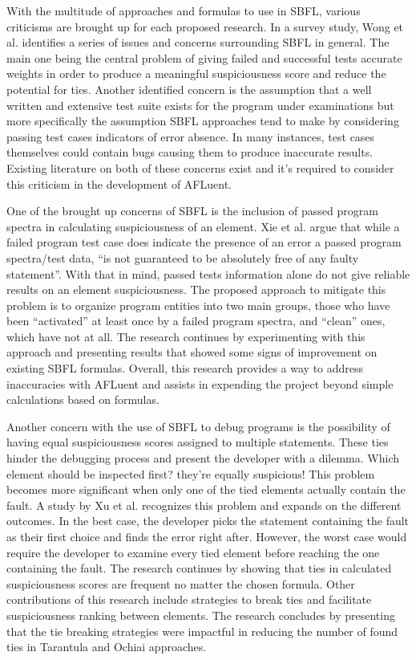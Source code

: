 With the multitude of approaches and formulas to use in SBFL, various criticisms
are brought up for each proposed research. In a survey study, Wong et al.
\cite{wong2016survey} identifies a series of issues and concerns surrounding
SBFL in general. The main one being the central problem of giving failed and
successful tests accurate weights in order to produce a meaningful
suspiciousness score and reduce the potential for ties. Another identified
concern is the assumption that a well written and extensive test suite exists
for the program under examinations but more specifically the assumption SBFL approaches tend to make by
considering passing test cases indicators of error absence. In many instances,
test cases themselves could contain bugs causing them to produce inaccurate results. Existing literature
on both of these concerns exist and it's required to consider this criticism in
the development of AFLuent.

One of the brought up concerns of SBFL is the inclusion of passed program
spectra in calculating suspiciousness of an element. Xie et al.
\cite{xie2010isolating} argue that while a failed program test case does
indicate the presence of an error a passed program spectra/test data, ``is not
guaranteed to be absolutely free of any faulty statement''. With that in mind,
passed tests information alone do not give reliable results on an element
suspiciousness. The proposed approach to mitigate this problem is to organize
program entities into two main groups, those who have been ``activated'' at
least once by a failed program spectra, and ``clean'' ones, which have not at
all. The research continues by experimenting with this approach and presenting
results that showed some signs of improvement on existing SBFL formulas.
Overall, this research provides a way to address inaccuracies with AFLuent and
assists in expending the project beyond simple calculations based on formulas.

Another concern with the use of SBFL to debug programs is the possibility of
having equal suspiciousness scores assigned to multiple statements. These ties
hinder the debugging process and present the developer with a dilemma. Which
element should be inspected first? they're equally suspicious! This problem
becomes more significant when only one of the tied elements actually contain the
fault. A study by Xu et al. \cite{xu2011ties} recognizes this problem and
expands on the different outcomes. In the best case, the developer picks the
statement containing the fault as their first choice and finds the error right
after. However, the worst case would require the developer to examine every tied
element before reaching the one containing the fault. The research continues by
showing that ties in calculated suspiciousness scores are frequent no matter the
chosen formula. Other contributions of this research include strategies to break
ties and facilitate suspiciousness ranking between elements. The research
concludes by presenting that the tie breaking strategies were impactful in
reducing the number of found ties in Tarantula and Ochiai approaches.

